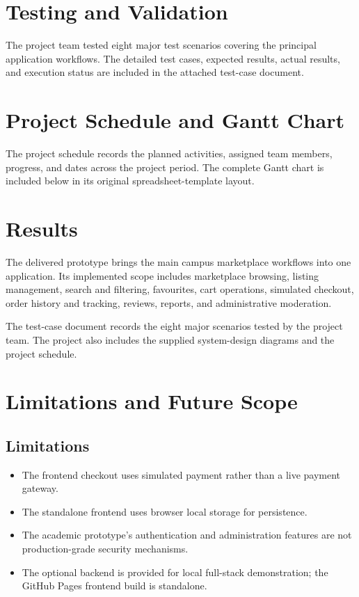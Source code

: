 \documentclass[12pt,a4paper]{report}
\begin{document}
\chapter{Testing and Validation}
The project team tested eight major test scenarios covering the principal
application workflows. The detailed test cases, expected results, actual
results, and execution status are included in the attached test-case document.

\clearpage

\clearpage

\chapter{Project Schedule and Gantt Chart}
The project schedule records the planned activities, assigned team members,
progress, and dates across the project period. The complete Gantt chart is
included below in its original spreadsheet-template layout.

\clearpage

\clearpage

\chapter{Results}
The delivered prototype brings the main campus marketplace workflows into one
application. Its implemented scope includes marketplace browsing, listing
management, search and filtering, favourites, cart operations, simulated
checkout, order history and tracking, reviews, reports, and administrative
moderation.

The test-case document records the eight major scenarios tested by the project
team. The project also includes the supplied system-design diagrams and the
project schedule.

\chapter{Limitations and Future Scope}
\section{Limitations}
\begin{itemize}
    \item The frontend checkout uses simulated payment rather than a live payment gateway.
    \item The standalone frontend uses browser local storage for persistence.
    \item The academic prototype's authentication and administration features
    are not production-grade security mechanisms.
    \item The optional backend is provided for local full-stack demonstration;
    the GitHub Pages frontend build is standalone.
\end{itemize}
\end{document}
